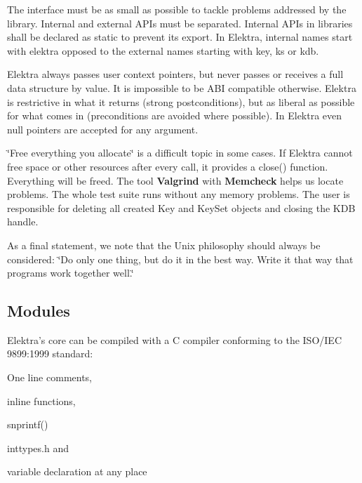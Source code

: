 The interface must be as small as possible to tackle problems addressed by the library. Internal and external A\+P\+Is must be separated. Internal A\+P\+Is in libraries shall be declared as {\ttfamily static} to prevent its export. In Elektra, internal names start with {\ttfamily elektra} opposed to the external names starting with {\ttfamily key}, {\ttfamily ks} or {\ttfamily kdb}.

Elektra always passes user context pointers, but never passes or receives a full data structure by value. It is impossible to be A\+BI compatible otherwise. Elektra is restrictive in what it returns (strong postconditions), but as liberal as possible for what comes in (preconditions are avoided where possible). In Elektra even null pointers are accepted for any argument.

\char`\"{}\+Free everything you allocate\char`\"{} is a difficult topic in some cases. If Elektra cannot free space or other resources after every call, it provides a {\ttfamily close()} function. Everything will be freed. The tool {\bfseries Valgrind} with {\bfseries Memcheck} helps us locate problems. The whole test suite runs without any memory problems. The user is responsible for deleting all created {\ttfamily Key} and {\ttfamily Key\+Set} objects and closing the {\ttfamily K\+DB} handle.

As a final statement, we note that the Unix philosophy should always be considered\+: \char`\"{}\+Do only one thing, but do it in the best way. Write it
that way that programs work together well.\char`\"{}

\subsection*{Modules}

Elektra’s core can be compiled with a C compiler conforming to the I\+S\+O/\+I\+EC 9899\+:1999 standard\+:


\begin{DoxyItemize}
\item One line comments,
\item inline functions,
\item {\ttfamily snprintf()}
\item inttypes.\+h and
\item variable declaration at any place
\end{DoxyItemize}

